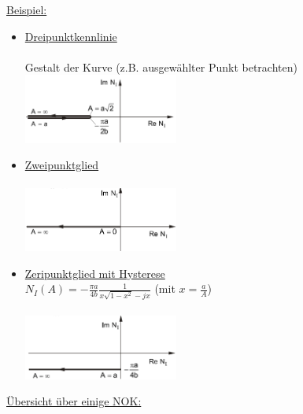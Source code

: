 \documentclass[openany,a4paper,11pt]{book}
\begin{document}
\uline{Beispiel:}\begin{itemize}
    \item \uline{Dreipunktkennlinie}\\
    \\
    Gestalt der Kurve (z.B. ausgewählter Punkt betrachten)\\
    \includegraphics[width=2in]{imgs/NLR52.png}
    \item \uline{Zweipunktglied}\\
    \\
    \includegraphics[width=2in]{imgs/NLR53.png}
    \item \uline{Zeripunktglied mit Hysterese}\\
    $N_I(A)=-\frac{\pi a}{4b}\frac{1}{x\sqrt{1-x^2}-jx}$ (mit $x=\frac{a}{A}$)\\
    \\
    \includegraphics[width=2in]{imgs/NLR54.png}
\end{itemize}
\uline{Übersicht über einige NOK:} 
\end{document}
